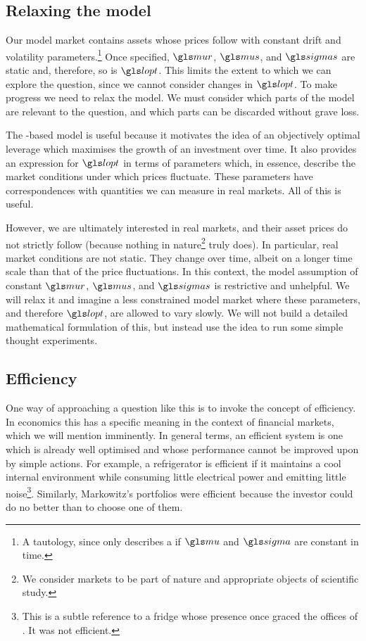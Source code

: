 \subsection{Relaxing the model}
Our model market contains assets whose prices follow \GBM with constant drift and volatility parameters.\footnote{A tautology, since  only describes a \GBM if $\gmu$ and $\gsigma$ are constant in time.} Once specified, $\mur$, $\mus$, and $\sigmas$ are static and, therefore, so is $\lopt$. This limits the extent to which we can explore the question, since we cannot consider changes in $\lopt$. To make progress we need to relax the model. We must consider which parts of the model are relevant to the question, and which parts can be discarded without grave loss.

The \GBM-based model is useful because it motivates the idea of an objectively optimal leverage which maximises the growth of an investment over time. It also provides an expression for $\lopt$ in terms of parameters which, in essence, describe the market conditions under which prices fluctuate. These parameters have correspondences with quantities we can measure in real markets. All of this is useful.

However, we are ultimately interested in real markets, and their asset prices do not strictly follow \GBM (because nothing in nature\footnote{We consider markets to be part of nature and appropriate objects of scientific study.} truly does). In particular, real market conditions are not static. They change over time, albeit on a longer time scale than that of the price fluctuations. In this context, the model assumption of constant $\mur$, $\mus$, and $\sigmas$ is restrictive and unhelpful. We will relax it and imagine a less constrained model market where these parameters, and therefore $\lopt$, are allowed to vary slowly. We will not build a detailed mathematical formulation of this, but instead use the idea to run some simple thought experiments.

\subsection{Efficiency}
One way of approaching a question like this is to invoke the concept of efficiency. In economics this has a specific meaning in the context of financial markets, which we will mention imminently. In general terms, an efficient system is one which is already well optimised and whose performance cannot be improved upon by simple actions. For example, a refrigerator is efficient if it maintains a cool internal environment while consuming little electrical power and emitting little noise\footnote{This is a subtle reference to a fridge whose presence once graced the offices of \LML. It was not efficient.}. Similarly, Markowitz's portfolios were efficient because the investor could do no better than to choose one of them. 

